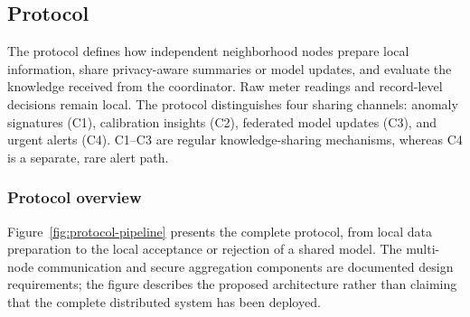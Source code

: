 \documentclass[11pt,a4paper]{article}
\begin{document}
\subsection{Protocol}
\label{subsec:protocol}

The protocol defines how independent neighborhood nodes prepare local
information, share privacy-aware summaries or model updates, and evaluate
the knowledge received from the coordinator. Raw meter readings and
record-level decisions remain local. The protocol distinguishes four
sharing channels: anomaly signatures (C1), calibration insights (C2),
federated model updates (C3), and urgent alerts (C4). C1--C3 are regular
knowledge-sharing mechanisms, whereas C4 is a separate, rare alert path.

\subsubsection{Protocol overview}

Figure~\ref{fig:protocol-pipeline} presents the complete protocol, from
local data preparation to the local acceptance or rejection of a shared
model. The multi-node communication and secure aggregation components
are documented design requirements; the figure describes the proposed
architecture rather than claiming that the complete distributed system
has been deployed.
\end{document}
